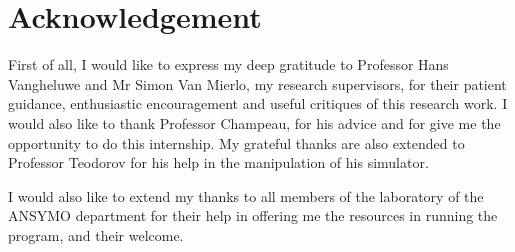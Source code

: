 
\chapter*{Acknowledgement}
First of all, I would like to express my deep gratitude to Professor Hans Vangheluwe and Mr Simon Van Mierlo, my research supervisors, for their patient guidance, enthusiastic encouragement and useful critiques of this research work. I would also like to thank Professor Champeau, for his advice and for give me the opportunity to do this internship. My grateful thanks are also extended to Professor Teodorov for his help in the manipulation of his simulator.

I would also like to extend my thanks to all members of the laboratory of the ANSYMO department for their help in offering me the resources in running the program, and their welcome.


\newpage

